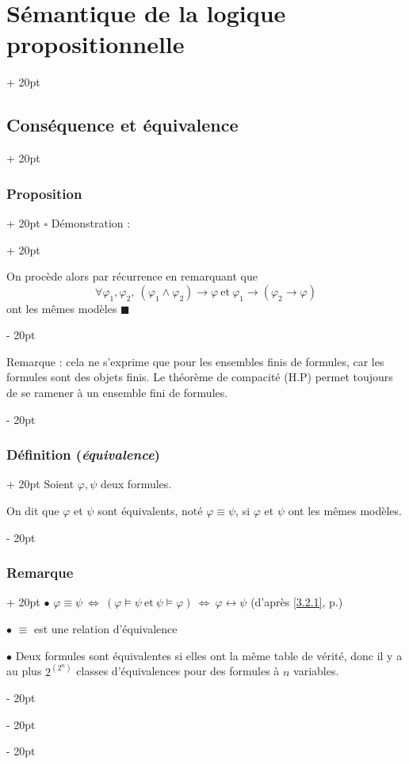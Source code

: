 \documentclass[a4paper, 12pt, twoside]{article}
\newcommand{\ssi}{\ \Leftrightarrow \ }
\newcommand{\ind}[1][20pt]{\advance\leftskip + #1}
\newcommand{\deind}[1][20pt]{\advance\leftskip - #1}
\newenvironment{indt}[2][20pt]{#2 \par \ind[#1]}{\par \deind} %
\begin{document}
\begin{indt}{\section{Sémantique de la logique propositionnelle}}
\begin{indt}{\subsection{Conséquence et équivalence}}
\begin{indt}{\subsubsection{Proposition}}
\begin{indt}{$\square$ Démonstration :}
                    \vspace{12pt}
                    
                    On procède alors par récurrence en remarquant que
                        \[ \forall \varphi_1, \varphi_2,\ (\varphi_1 \wedge \varphi_2) \rightarrow \varphi\ \text{et}\ \varphi_1 \rightarrow (\varphi_2 \rightarrow \varphi) \]
                    ont les mêmes modèles $\blacksquare$
                \end{indt}
                
                \vspace{12pt}
                
                Remarque : cela ne s'exprime que pour les ensembles finis de formules, car les formules sont des objets finis. Le théorème de compacité (H.P) permet toujours de se ramener à un ensemble fini de formules.
            \end{indt}
            
            \vspace{12pt}
            
            \begin{indt}{\subsubsection{Définition (\textit{équivalence})}}
                Soient $\varphi, \psi$ deux formules.
                
                On dit que $\varphi$ et $\psi$ sont équivalents, noté $\varphi \equiv \psi$, si $\varphi$ et $\psi$ ont les mêmes modèles.
            \end{indt}
            
            \vspace{12pt}
            
            \begin{indt}{\subsubsection{Remarque}}
                $\bullet$ $\varphi \equiv \psi \ssi (\varphi \vDash \psi\ \text{et}\ \psi \vDash \varphi) \ssi \varphi \leftrightarrow \psi$ (d'après \ref{3.2.1}, p.\pageref{3.2.1})
                
                $\bullet$ $\equiv$ est une relation d'équivalence
                
                $\bullet$ Deux formules sont équivalentes si elles ont la même table de vérité, donc il y a au plus $2^{(2^n)}$ classes d'équivalences pour des formules à $n$ variables.
                

\end{indt}
\end{indt}
\end{indt}
\end{document}
